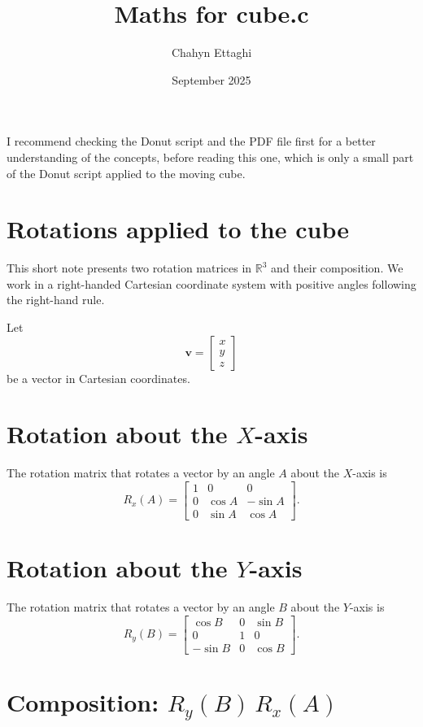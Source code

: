 \documentclass{article}
\title{Maths for cube.c}
\author{Chahyn Ettaghi}
\date{September 2025}
\begin{document}
\maketitle

I recommend checking the Donut script and the PDF file first for a better understanding of the concepts, before reading this one, which is only a small part of the Donut script applied to the moving cube.
\section*{Rotations applied to the cube}

This short note presents two rotation matrices in $\mathbb{R}^3$ and their composition. We work in a right-handed Cartesian coordinate system with positive angles following the right-hand rule.

\medskip

Let
\[
\bm{v} = \begin{bmatrix} x \\ y \\ z \end{bmatrix}
\]
be a vector in Cartesian coordinates.

\section*{Rotation about the $X$-axis}

The rotation matrix that rotates a vector by an angle $A$ about the $X$-axis is
\[
R_x(A) = \begin{bmatrix}
1 & 0 & 0 \\
0 & \cos A & -\sin A \\
0 & \sin A & \cos A
\end{bmatrix}.
\]

\section*{Rotation about the $Y$-axis}

The rotation matrix that rotates a vector by an angle $B$ about the $Y$-axis is
\[
R_y(B) = \begin{bmatrix}
\cos B & 0 & \sin B \\
0 & 1 & 0 \\
-\sin B & 0 & \cos B
\end{bmatrix}.
\]

\section*{Composition: $R_y(B)\,R_x(A)$}
\end{document}
